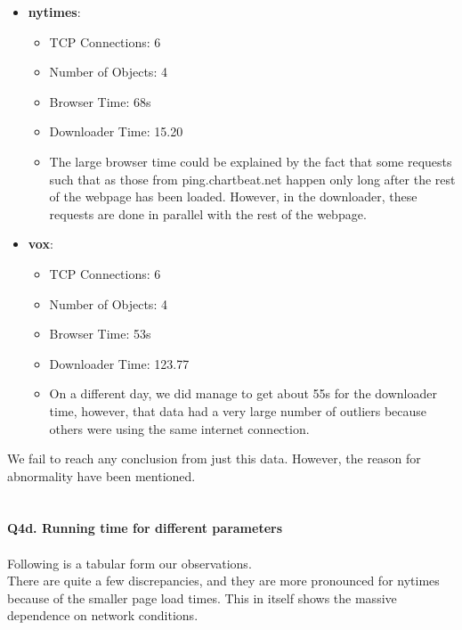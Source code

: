 \documentclass[12pt]{article}
\begin{document}
\begin{itemize}
\item \textbf{nytimes}: 
\begin{itemize}
	\item TCP Connections: 6
	\item Number of Objects: 4
	\item Browser Time: 68s
	\item Downloader Time: 15.20
\item The large browser time could be explained by the fact that some requests such that as those from ping.chartbeat.net happen only long after the rest of the webpage has been loaded. However, in the downloader, these requests are done in parallel with the rest of the webpage.
\end{itemize}

\item \textbf{vox}:
\begin{itemize}
	\item TCP Connections: 6
	\item Number of Objects: 4
	\item Browser Time: 53s
	\item Downloader Time: 123.77
	\item On a different day, we did manage to get about 55s for the downloader time, however, that data had a very large number of outliers because others were using the same internet connection.
\end{itemize}
\end{itemize}
We fail to reach any conclusion from just this data. However, the reason for abnormality have been mentioned.
~\\\\\\
{\bfseries Q4d. Running time for different parameters}
\\\\
Following is a tabular form our observations.\\
There are quite a few discrepancies, and they are more pronounced for nytimes because of the smaller page load times. This in itself shows the massive dependence on network conditions. 
\\\\
\hspace*{-1cm}
\end{document}
